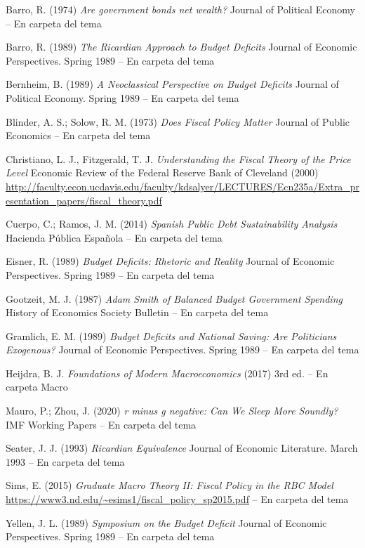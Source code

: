 \documentclass{nuevotema}
\begin{document}
Barro, R. (1974) \textit{Are government bonds net wealth?} Journal of Political Economy 
-- En carpeta del tema

Barro, R. (1989) \textit{The Ricardian Approach to Budget Deficits} Journal of Economic Perspectives. Spring 1989 -- En carpeta del tema

Bernheim, B. (1989) \textit{A Neoclassical Perspective on Budget Deficits} Journal of Political Economy. Spring 1989 -- En carpeta del tema

Blinder, A. S.; Solow, R. M. (1973) \textit{Does Fiscal Policy Matter} Journal of Public Economics -- En carpeta del tema

Christiano, L. J., Fitzgerald, T. J. \textit{Understanding the Fiscal Theory of the Price Level} Economic Review of the Federal Reserve Bank of Cleveland (2000) \url{http://faculty.econ.ucdavis.edu/faculty/kdsalyer/LECTURES/Ecn235a/Extra\_presentation\_papers/fiscal\_theory.pdf}

Cuerpo, C.; Ramos, J. M. (2014) \textit{Spanish Public Debt Sustainability Analysis} Hacienda Pública Española -- En carpeta del tema

Eisner, R. (1989) \textit{Budget Deficits: Rhetoric and Reality} Journal of Economic Perspectives. Spring 1989 -- En carpeta del tema

Gootzeit, M. J. (1987) \textit{Adam Smith of Balanced Budget Government Spending} History of Economics Society Bulletin -- En carpeta del tema

Gramlich, E. M. (1989) \textit{Budget Deficits and National Saving: Are Politicians Exogenous?} Journal of Economic Perspectives. Spring 1989 -- En carpeta del tema

Heijdra, B. J. \textit{Foundations of Modern Macroeconomics} (2017) 3rd ed. -- En carpeta Macro

Mauro, P.; Zhou, J. (2020) \textit{r minus g negative: Can We Sleep More Soundly?} IMF Working Papers -- En carpeta del tema

Seater, J. J. (1993) \textit{Ricardian Equivalence} Journal of Economic Literature. March 1993 -- En carpeta del tema

Sims, E. (2015) \textit{Graduate Macro Theory II: Fiscal Policy in the RBC Model} \url{https://www3.nd.edu/~esims1/fiscal_policy_sp2015.pdf} -- En carpeta del tema

Yellen, J. L. (1989) \textit{Symposium on the Budget Deficit} Journal of Economic Perspectives. Spring 1989 -- En carpeta del tema
\end{document}
